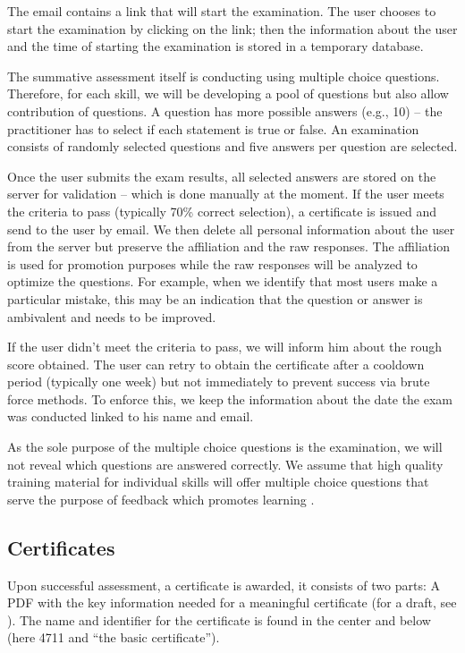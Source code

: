 \documentclass[jocse]{jocseart}
\begin{document}
The email contains a link that will start the examination.
The user chooses to start the examination by clicking on the link; then the information about the user and the time of starting the examination is stored in a temporary database.

The summative assessment itself is conducting using multiple choice questions.
Therefore, for each skill, we will be developing a pool of questions but also allow contribution of questions.
A question has more possible answers (e.g., 10) -- the practitioner has to select if each  statement is true or false.
An examination consists of randomly selected questions and five answers per question are selected.

Once the user submits the exam results, all selected answers are stored on the server for validation -- which is done manually at the moment.
If the user meets the criteria to pass (typically 70\% correct selection), a certificate is issued and send to the user by email.
We then delete all personal information about the user from the server but preserve the affiliation and the raw responses.
The affiliation is used for promotion purposes while the raw responses will be analyzed to optimize the questions.
For example, when we identify that most users make a particular mistake, this may be an indication that the question or answer is ambivalent and needs to be improved.

If the user didn't meet the criteria to pass, we will inform him about the rough score obtained.
The user can retry to obtain the certificate after a cooldown period (typically one week) but not immediately to prevent success via brute force methods.
To enforce this, we keep the information about the date the exam was conducted linked to his name and email.

As the sole purpose of the multiple choice questions is the examination, we will not reveal which questions are answered correctly.
We assume that high quality training material for individual skills will offer multiple choice questions that serve the purpose of feedback which promotes learning  \cite{epstein2002immediate}.

\subsection{Certificates}

Upon successful assessment, a certificate is awarded, it consists of two parts:
A PDF with the key information needed for a meaningful certificate (for a draft, see ).
The name and identifier for the certificate is found in the center and below (here 4711 and “the basic certificate”).
\end{document}
